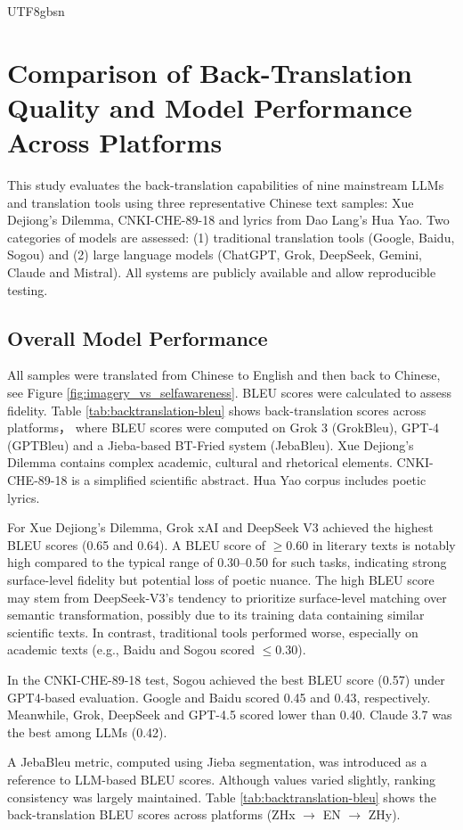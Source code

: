 \documentclass[conference]{IEEEtran}
\begin{document}
\begin{CJK}{UTF8}{gbsn}
\section{Comparison of Back-Translation Quality and Model Performance Across Platforms}
This study evaluates the back-translation capabilities of nine mainstream LLMs and translation tools using three representative Chinese text samples: Xue Dejiong’s Dilemma, CNKI-CHE-89-18 and lyrics from Dao Lang’s Hua Yao. Two categories of models are assessed: (1) traditional translation tools (Google, Baidu, Sogou) and (2) large language models (ChatGPT, Grok, DeepSeek, Gemini, Claude and Mistral). All systems are publicly available and allow reproducible testing.


\subsection{Overall Model Performance}
All samples were translated from Chinese to English and then back to Chinese, see Figure \ref{fig:imagery_vs_selfawareness}. BLEU scores were calculated to assess fidelity. Table \ref{tab:backtranslation-bleu} shows back-translation scores across platforms， where BLEU scores were computed on Grok 3 (GrokBleu), GPT-4 (GPTBleu) and a Jieba-based BT-Fried system (JebaBleu). Xue Dejiong’s Dilemma contains complex academic, cultural and rhetorical elements. CNKI-CHE-89-18 is a simplified scientific abstract. Hua Yao corpus includes poetic lyrics.

For Xue Dejiong’s Dilemma, Grok xAI and DeepSeek V3 achieved the highest BLEU scores (0.65 and 0.64). A BLEU score of $\geq 0.60$ in literary texts is notably high compared to the typical range of 0.30–0.50 for such tasks, indicating strong surface-level fidelity but potential loss of poetic nuance. The high BLEU score may stem from DeepSeek-V3’s tendency to prioritize surface-level matching over semantic transformation, possibly due to its training data containing similar scientific texts. In contrast, traditional tools performed worse, especially on academic texts (e.g., Baidu and Sogou scored $\leq 0.30$).  

In the CNKI-CHE-89-18 test, Sogou achieved the best BLEU score (0.57) under GPT4-based evaluation. Google and Baidu scored 0.45 and 0.43, respectively. Meanwhile, Grok, DeepSeek and GPT-4.5 scored lower than 0.40. Claude 3.7 was the best among LLMs (0.42).

A JebaBleu metric, computed using Jieba segmentation, was introduced as a reference to LLM-based BLEU scores. Although values varied slightly, ranking consistency was largely maintained. Table \ref{tab:backtranslation-bleu} shows the back-translation BLEU scores across platforms (ZHx $\rightarrow$ EN $\rightarrow$ ZHy).



\end{CJK}
\end{document}
